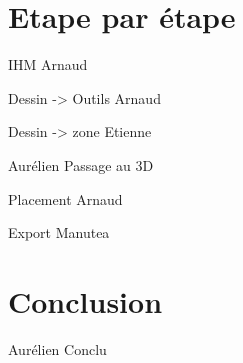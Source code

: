 \documentclass[a4paper,10pt]{beamer}
\begin{document}
			
	\section{Etape par étape}
	
	\begin{frame}
		IHM Arnaud
	\end{frame}
	
	\begin{frame}
		Dessin -> Outils Arnaud
	\end{frame}
	
	\begin{frame}
		Dessin -> zone Etienne
	\end{frame}
	
	\begin{frame}
		Aurélien Passage au 3D
	\end{frame}
	
	\begin{frame}
		Placement Arnaud
	\end{frame}
	
	\begin{frame}
		Export Manutea
	\end{frame}
	
	\section{Conclusion}
	
	\begin{frame}
		Aurélien Conclu
	\end{frame}
		
\end{document}
